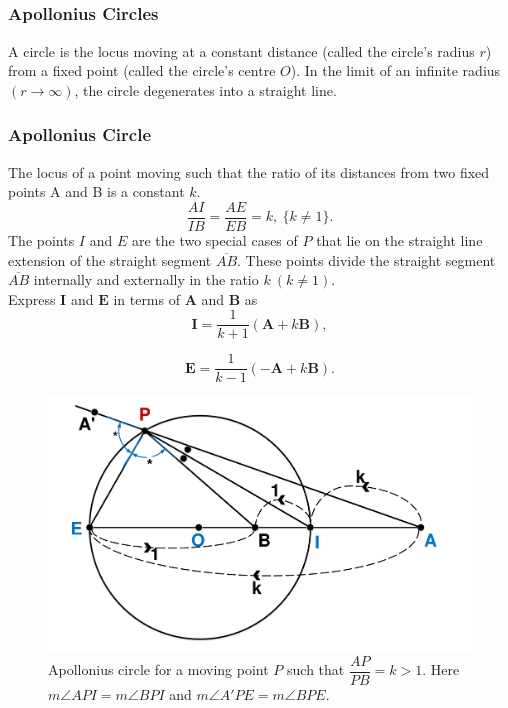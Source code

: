 \documentclass{beamer}
\begin{document}
\subsection{}
\begin{frame}
\frametitle{Apollonius Circles}
A circle is the locus moving at a constant distance (called the circle's radius $r$) from a fixed point (called the circle's centre $O$).
In the limit of an infinite radius $(r\longrightarrow\infty)$, the circle degenerates into a straight line.
\end{frame}
\begin{frame}
\frametitle{Apollonius Circle}
 The locus of a point moving such that the ratio of its distances from two fixed points A and B is a constant $k$.
 \begin{equation}
   \boxed{
   \dfrac{AI}{IB}=\dfrac{AE}{EB}=k,\ \{k\neq1\}.}
   \label{eqn:kratio}
    \end{equation} 
   The points $I$ and $E$ are the two special cases of $P$ that lie on the straight line extension of the straight segment $\overline{AB}$. These points divide the straight segment $\overline{AB}$ internally and externally in the ratio $k\ (k\neq1)$.\\
   
    Express $\boldsymbol{I}$ and $\boldsymbol{E}$ in terms of $\boldsymbol{A}$ and $\boldsymbol{B}$ as 
   \begin{equation}
   \boldsymbol{I} = \dfrac{1}{k+1} (\boldsymbol{A}+k\boldsymbol{B}),
   \label{eqn:ipoint}
   \end{equation}
   
   \begin{equation}
   \boldsymbol{E} = \dfrac{1}{k-1} (-\boldsymbol{A}+k\boldsymbol{B}).
   \label{eqn:epoint}
   \end{equation}   
\end{frame}
\begin{frame}
\begin{figure}[htb]
\centering
\includegraphics[scale = 0.3]{fig/drawing1.pdf}
\caption{Apollonius circle for a moving point $P$ such that $\dfrac{AP}{PB}=k>1$. Here $m\angle API = m\angle BPI$ and $m\angle A'PE = m\angle BPE$.}
\label{1}
\end{figure}
\end{frame}
\end{document}
